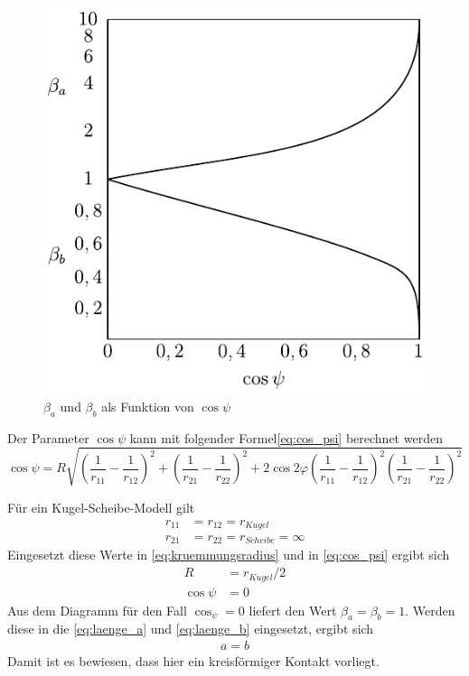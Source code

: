 \begin{figure}[htb]
    \centering
    \includegraphics[]{./images/beta_cos_psi_diagram.pdf}
    \caption{$\beta_a$ und $\beta_b$ als Funktion von $\cos{\psi}$\cite{wisniewski}}
    \label{fig:beta_a_und_beta_b_als_funktion_der_cos_psi}
\end{figure}
%

Der Parameter $\cos{\psi}$ kann mit folgender Formel\ref{eq:cos_psi} berechnet werden
\begin{equation}
    \label{eq:cos_psi}
    \cos{\psi} = R  \sqrt{\left( \frac{1}{r_{11}} - \frac{1}{r_{12}} \right)^2 
                                + \left( \frac{1}{r_{21}} - \frac{1}{r_{22}} \right)^2 
                                + 2  \cos{2 \varphi} 
                                 \left( \frac{1}{r_{11}} - \frac{1}{r_{12}}  \right)^2 
                                 \left( \frac{1}{r_{21}} - \frac{1}{r_{22}} \right)^2}
\end{equation}
%

Für ein Kugel-Scheibe-Modell gilt
%
\begin{align*}
    r_{11} &= r_{12} = r_{Kugel} \\
    r_{21} &= r_{22} = r_{Scheibe} = \infty
\end{align*}
%
Eingesetzt diese Werte in \ref{eq:kruemmungsradius} und in \ref{eq:cos_psi} ergibt sich 
%
\begin{align*}
    R &= r_{Kugel}/2 \\
    \cos{\psi} &= 0
\end{align*}
%
Aus dem Diagramm für den Fall $\cos_{\psi} = 0$ liefert den Wert $\beta_a = \beta_b = 1$.
Werden diese in die \ref{eq:laenge_a} und \ref{eq:laenge_b} eingesetzt, ergibt sich
%
\begin{align*}
    a = b
\end{align*}
%
Damit ist es bewiesen, dass hier ein kreisförmiger Kontakt vorliegt.

